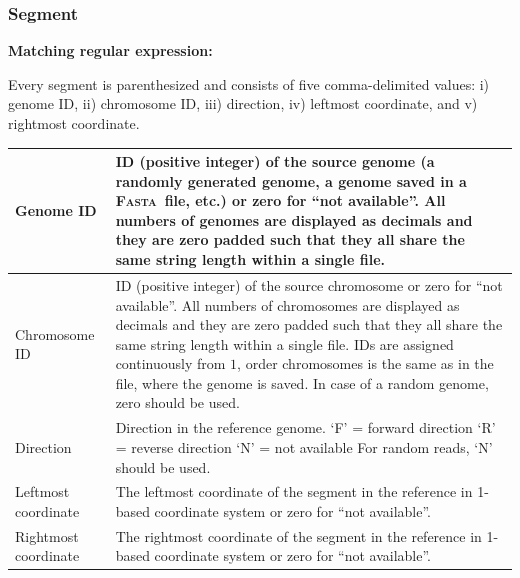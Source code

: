\documentclass[10pt,a4paper]{article}
\newcommand{\re}[1]{\framebox{\mbox{\texttt{#1}}}}
\newcommand{\mre}[1]{\hspace{0.5cm}\textbf{Matching regular expression:} \re{#1}\smallskip}
\newcommand{\FASTA}{{\textsc{Fasta}}}
\begin{document}
%

\subsubsection*{Segment}

\mre{\char94\char92(([0-9]+),([0-9]+),([FRN]),([0-9]+),([0-9]+)\char92)\char36}

Every {segment} is parenthesized and consists
of five comma-delimited values:
i) {genome ID},
ii) {chromosome ID},
iii) {direction},
iv) {leftmost coordinate}, and
v) {rightmost coordinate}.

\medskip

\begin{tabular}{|p{3.4cm}|p{11.0cm}|}
\hline
	{Genome ID} &
		ID (positive integer) of the source genome
		(a randomly generated genome, a genome saved in a \FASTA\ file,
		etc.) or zero for ``not available''. 
		\newline\newline
		All numbers of genomes are displayed as decimals and they
		are zero padded such that
		they all share the same string length within a single file. 
		\\\hline
	{Chromosome ID} &
		ID (positive integer) of the source chromosome
		or zero for ``not available''.
		\newline
		\newline
		All numbers of chromosomes are displayed as decimals and they are zero padded such that they all share the same string length within a single file.
		\newline
		\newline
		IDs are assigned continuously from $1$,
		order chromosomes is the same as in
		the file, where the genome is saved.
		In case of a random genome, zero should be used.
		\\\hline
	{Direction} &
		Direction in the reference genome.
		\newline
		\newline
		`F' = forward direction \newline
		`R' = reverse direction \newline
		`N' = not available
		\newline
		\newline
		For random reads, `N' should be used.
		\\\hline
	{Leftmost coordinate} &
		The leftmost
		coordinate of the segment in the reference in 1-based coordinate system or zero for ``not available''. 
		\\\hline
	{Rightmost coordinate} & 
		The rightmost
		coordinate of the segment in the reference in 1-based coordinate system or zero for ``not available''. 
		\\\hline
\end{tabular}
\end{document}
